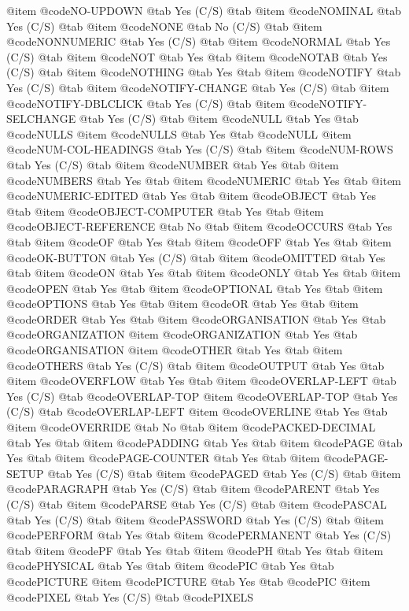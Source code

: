 @item @code{NO-UPDOWN} @tab Yes	(C/S) @tab 
@item @code{NOMINAL} @tab Yes	(C/S) @tab 
@item @code{NONE} @tab No	(C/S) @tab 
@item @code{NONNUMERIC} @tab Yes	(C/S) @tab 
@item @code{NORMAL} @tab Yes	(C/S) @tab 
@item @code{NOT} @tab Yes @tab 
@item @code{NOTAB} @tab Yes	(C/S) @tab 
@item @code{NOTHING} @tab Yes @tab 
@item @code{NOTIFY} @tab Yes	(C/S) @tab 
@item @code{NOTIFY-CHANGE} @tab Yes	(C/S) @tab 
@item @code{NOTIFY-DBLCLICK} @tab Yes	(C/S) @tab 
@item @code{NOTIFY-SELCHANGE} @tab Yes	(C/S) @tab 
@item @code{NULL} @tab Yes @tab @code{NULLS}
@item @code{NULLS} @tab Yes @tab @code{NULL}
@item @code{NUM-COL-HEADINGS} @tab Yes	(C/S) @tab 
@item @code{NUM-ROWS} @tab Yes	(C/S) @tab 
@item @code{NUMBER} @tab Yes @tab 
@item @code{NUMBERS} @tab Yes @tab 
@item @code{NUMERIC} @tab Yes @tab 
@item @code{NUMERIC-EDITED} @tab Yes @tab 
@item @code{OBJECT} @tab Yes @tab 
@item @code{OBJECT-COMPUTER} @tab Yes @tab 
@item @code{OBJECT-REFERENCE} @tab No @tab 
@item @code{OCCURS} @tab Yes @tab 
@item @code{OF} @tab Yes @tab 
@item @code{OFF} @tab Yes @tab 
@item @code{OK-BUTTON} @tab Yes	(C/S) @tab 
@item @code{OMITTED} @tab Yes @tab 
@item @code{ON} @tab Yes @tab 
@item @code{ONLY} @tab Yes @tab 
@item @code{OPEN} @tab Yes @tab 
@item @code{OPTIONAL} @tab Yes @tab 
@item @code{OPTIONS} @tab Yes @tab 
@item @code{OR} @tab Yes @tab 
@item @code{ORDER} @tab Yes @tab 
@item @code{ORGANISATION} @tab Yes @tab @code{ORGANIZATION}
@item @code{ORGANIZATION} @tab Yes @tab @code{ORGANISATION}
@item @code{OTHER} @tab Yes @tab 
@item @code{OTHERS} @tab Yes	(C/S) @tab 
@item @code{OUTPUT} @tab Yes @tab 
@item @code{OVERFLOW} @tab Yes @tab 
@item @code{OVERLAP-LEFT} @tab Yes	(C/S) @tab @code{OVERLAP-TOP}
@item @code{OVERLAP-TOP} @tab Yes	(C/S) @tab @code{OVERLAP-LEFT}
@item @code{OVERLINE} @tab Yes @tab 
@item @code{OVERRIDE} @tab No @tab 
@item @code{PACKED-DECIMAL} @tab Yes @tab 
@item @code{PADDING} @tab Yes @tab 
@item @code{PAGE} @tab Yes @tab 
@item @code{PAGE-COUNTER} @tab Yes @tab 
@item @code{PAGE-SETUP} @tab Yes	(C/S) @tab 
@item @code{PAGED} @tab Yes	(C/S) @tab 
@item @code{PARAGRAPH} @tab Yes	(C/S) @tab 
@item @code{PARENT} @tab Yes	(C/S) @tab 
@item @code{PARSE} @tab Yes	(C/S) @tab 
@item @code{PASCAL} @tab Yes	(C/S) @tab 
@item @code{PASSWORD} @tab Yes	(C/S) @tab 
@item @code{PERFORM} @tab Yes @tab 
@item @code{PERMANENT} @tab Yes	(C/S) @tab 
@item @code{PF} @tab Yes @tab 
@item @code{PH} @tab Yes @tab 
@item @code{PHYSICAL} @tab Yes @tab 
@item @code{PIC} @tab Yes @tab @code{PICTURE}
@item @code{PICTURE} @tab Yes @tab @code{PIC}
@item @code{PIXEL} @tab Yes	(C/S) @tab @code{PIXELS}
